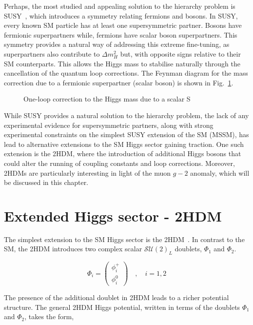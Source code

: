 Perhaps, the most studied and appealing solution to the hierarchy problem is \ac{SUSY}~\cite{SUSY}, which introduces a symmetry relating fermions and bosons. In SUSY, every known SM particle has at least one supersymmetric partner. Bosons have fermionic superpartners while, fermions have scalar boson superpartners. This symmetry provides a natural way of addressing this extreme fine-tuning, as superpartners also contribute to $\Delta m_H^2$ but, with opposite signs relative to their SM counterparts. This allows the Higgs mass to stabilise naturally through the cancellation of the quantum loop corrections. The Feynman diagram for the mass correction due to a fermionic superpartner (scalar boson) is shown in Fig.~\ref{Figure:Chapter2_Hierarchy_Feynman2}.

\begin{figure}[h]
\centering

\caption{One-loop correction to the Higgs mass due to a scalar S}
\label{Figure:Chapter2_Hierarchy_Feynman2}
\end{figure}

While SUSY provides a natural solution to the hierarchy problem, the lack of any experimental evidence for supersymmetric partners, along with strong experimental constraints on the simplest SUSY extension of the SM (MSSM), has lead to alternative extensions to the SM Higgs sector gaining traction. One such extension is the \ac{2HDM}, where the introduction of additional Higgs bosons that could alter the running of coupling constants and loop corrections. Moreover, 2HDMs are particularly interesting in light of the muon $g-2$ anomaly, which will be discussed in this chapter.

\section{Extended Higgs sector - 2HDM}
\label{Section:Chapter2_2HDM}
The simplest extension to the SM Higgs sector is the 2HDM~\cite{2HDM_1}. In contrast to the SM, the 2HDM introduces two complex scalar $\mathcal{SU(2)}_L$ doublets, $\Phi_1$ and $\Phi_2$.

\begin{equation}
\Phi_i =
\begin{pmatrix}
\phi_i^{+} \\
\phi_i^{0} 
\end{pmatrix}
\quad ,\quad i = 1,2
\end{equation}

The presence of the additional doublet in 2HDM leads to a richer potential structure. The general 2HDM Higgs potential, written in terms of the doublets $\Phi_1$ and $\Phi_2$, takes the form,

